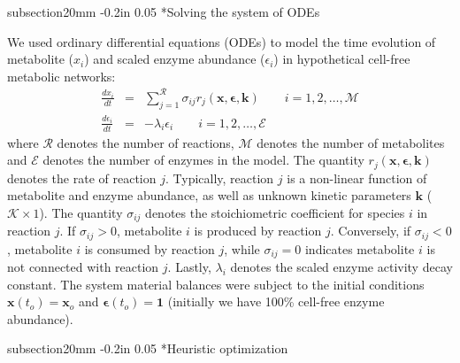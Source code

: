 \documentclass[12pt]{article}
\makeatletter
\renewcommand\section{\@startsection
	{subsection}{2}{0mm}
	{-0.2in}
	{0.05\baselineskip}
	{\normalfont\large\bfseries}}
\makeatother
\begin{document}
\clearpage

\section*{Solving the system of ODEs}

We used ordinary differential equations (ODEs) to model the time evolution of metabolite ($x_{i}$) and scaled enzyme abundance ($\epsilon_{i}$) in hypothetical cell-free metabolic networks:
\begin{eqnarray}
	\frac{dx_{i}}{dt} & = & \sum_{j=1}^{\mathcal{R}}\sigma_{ij}r_{j}\left(\mathbf{x},\mathbf{\epsilon},\mathbf{k}\right)\qquad{i=1,2,\hdots,\mathcal{M}}\\
	\frac{d\epsilon_{i}}{dt} & = & -\lambda_{i}\epsilon_{i}\qquad{i=1,2,\hdots,\mathcal{E}}
\end{eqnarray}where $\mathcal{R}$ denotes the number of reactions, $\mathcal{M}$ denotes the number of metabolites and $\mathcal{E}$ denotes the number of enzymes in the model.
The quantity $r_{j}\left(\mathbf{x},\mathbf{\epsilon},\mathbf{k}\right)$ denotes the rate of reaction $j$.
Typically, reaction $j$ is a non-linear function of metabolite and enzyme abundance, as well as unknown kinetic parameters $\mathbf{k}$ ($\mathcal{K}\times{1}$).
The quantity $\sigma_{ij}$ denotes the stoichiometric coefficient for species $i$ in reaction $j$.
If $\sigma_{ij}>0$, metabolite $i$ is produced by reaction $j$.
Conversely, if $\sigma_{ij}<0$, metabolite $i$ is consumed by reaction $j$, while $\sigma_{ij}=0$ indicates metabolite $i$ is not connected with reaction $j$.
Lastly, $\lambda_{i}$ denotes the scaled enzyme activity decay constant.
The system material balances were subject to the initial conditions $\mathbf{x}\left(t_{o}\right)=\mathbf{x}_{o}$ and $\mathbf{\epsilon}\left(t_{o}\right)=\mathbf{1}$ (initially we have 100\% cell-free enzyme abundance).

\clearpage

\section*{Heuristic optimization}
\end{document}
